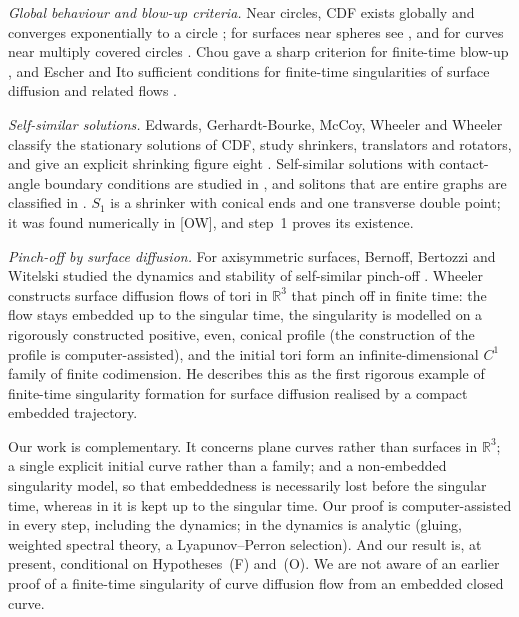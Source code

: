 \documentclass[11pt]{amsart}
\theoremstyle{definition}
\theoremstyle{remark}
\newcommand{\R}{\mathbb{R}}
\newcommand{\dref}[1]{[\textsf{#1}]}
\begin{document}
\emph{Global behaviour and blow-up criteria.} Near circles, CDF exists globally \cite{ElliottGarcke1997} and converges exponentially to a circle \cite{Wheeler2013}; for surfaces near spheres see \cite{EscherMayerSimonett1998,Wheeler2012}, and for curves near multiply covered circles \cite{MiuraOkabe2021}. Chou gave a sharp criterion for finite-time blow-up \cite{Chou2003}, and Escher and Ito sufficient conditions for finite-time singularities of surface diffusion and related flows \cite{EscherIto2005}.

\emph{Self-similar solutions.} Edwards, Gerhardt-Bourke, McCoy, Wheeler and Wheeler classify the stationary solutions of CDF, study shrinkers, translators and rotators, and give an explicit shrinking figure eight \cite{EGMWW2015}. Self-similar solutions with contact-angle boundary conditions are studied in \cite{AsaiGiga2014}, and solitons that are entire graphs are classified in \cite{RybkaWheeler2024}. $S_1$ is a shrinker with conical ends and one transverse double point; it was found numerically in \dref{OW}, and step~1 proves its existence.

\emph{Pinch-off by surface diffusion.} For axisymmetric surfaces, Bernoff, Bertozzi and Witelski studied the dynamics and stability of self-similar pinch-off \cite{BernoffBertozziWitelski1998}. Wheeler \cite{Wheeler2026} constructs surface diffusion flows of tori in $\R^3$ that pinch off in finite time: the flow stays embedded up to the singular time, the singularity is modelled on a rigorously constructed positive, even, conical profile (the construction of the profile is computer-assisted), and the initial tori form an infinite-dimensional $C^1$ family of finite codimension. He describes this as the first rigorous example of finite-time singularity formation for surface diffusion realised by a compact embedded trajectory.

Our work is complementary. It concerns plane curves rather than surfaces in $\R^3$; a single explicit initial curve rather than a family; and a non-embedded singularity model, so that embeddedness is necessarily lost before the singular time, whereas in \cite{Wheeler2026} it is kept up to the singular time. Our proof is computer-assisted in every step, including the dynamics; in \cite{Wheeler2026} the dynamics is analytic (gluing, weighted spectral theory, a Lyapunov--Perron selection). And our result is, at present, conditional on Hypotheses~(F) and~(O). We are not aware of an earlier proof of a finite-time singularity of curve diffusion flow from an embedded closed curve.
\end{document}
